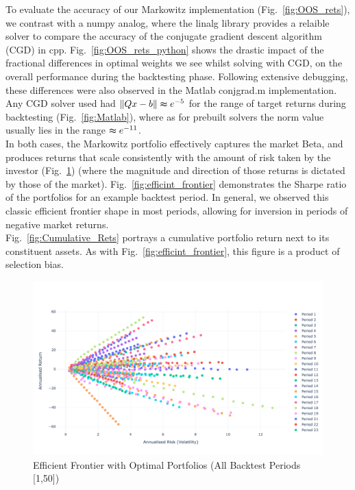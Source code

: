 \documentclass[12pt,twoside]{article}
\begin{document}
To evaluate the accuracy of our Markowitz implementation (Fig.~\ref{fig:OOS_rets}), we contrast with a numpy analog, where the linalg library provides a relaible solver to compare the accuracy of the conjugate gradient descent algorithm (CGD) in cpp. Fig.~\ref{fig:OOS_rets_python} shows the drastic impact of the fractional differences in optimal weights we see whilst solving with CGD, on the overall performance during the backtesting phase. Following extensive debugging, these differences were also observed in the Matlab conjgrad.m implementation. Any CGD solver used had $\lVert Qx - b \rVert \thickapprox e^{-5}$ for the range of target returns during backtesting (Fig.~\ref{fig:Matlab}), where as for prebuilt solvers the norm value usually lies in the range $\thickapprox e^{-11}$. \\

In both cases, the Markowitz portfolio effectively captures the market Beta, and produces returns that scale consistently with the amount of risk taken by the investor (Fig.~\ref{fig:eff_front_all}) (where the magnitude and direction of those returns is dictated by those of the market). Fig.~\ref{fig:efficint_frontier} demonstrates the Sharpe ratio of the portfolios for an example backtest period. In general, we observed this classic efficient frontier shape in most periods, allowing for inversion in periods of negative market returns. 
\\

Fig.~\ref{fig:Cumulative_Rets} portrays a cumulative portfolio return next to its constituent assets. As with Fig.~\ref{fig:efficint_frontier}, this figure is a product of selection bias.

\begin{figure}[]
    \centering
    \includegraphics[width = 1.0\hsize]{./figures/efficient_frontier_all_periods.png}
    \caption{Efficient Frontier with Optimal Portfolios (All Backtest Periods [1,50])}
    \label{fig:eff_front_all}
\end{figure}
\end{document}
